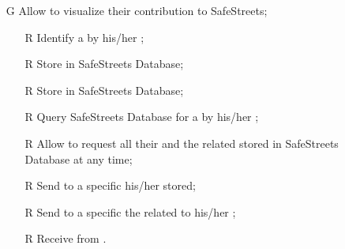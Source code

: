 \documentclass[../../../rasd.tex]{subfiles}
\begin{document}
\begin{itemize}
	\item[G\subs{8}]Allow  to visualize their contribution to SafeStreets;
	\begin{itemize}
		\item[R\subs{3}]Identify a  by his/her ;
		\item[R\subs{10}]Store  in SafeStreets Database;
		\item[R\subs{12}]Store  in SafeStreets Database;
		\item[R\subs{13}]Query SafeStreets Database for a  by his/her ;
		\item[R\subs{20}]Allow  to request all their  and the related  stored in SafeStreets Database at any time;
		\item[R\subs{21}]Send to a specific  his/her  stored;
		\item[R\subs{22}]Send to a specific  the  related to his/her ;
		\item[R\subs{32}]Receive  from .	
	\end{itemize}

\end{itemize}
\end{document}
